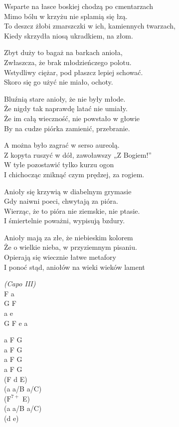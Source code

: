 \begin{text}
    \small{
    \hfill\break
Wsparte na łasce boskiej chodzą po cmentarzach\\
Mimo bólu w krzyżu nie splamią się łzą.\\
To deszcz żłobi zmarszczki w ich, kamiennych twarzach,\\
Kiedy skrzydła niosą ukradkiem, na złom.

Zbyt duży to bagaż na barkach anioła,\\
Zwłaszcza, że brak młodzieńczego polotu.\\
Wstydliwy ciężar, pod płaszcz lepiej schować.\\
Skoro się go użyć nie miało, ochoty.

Bluźnią stare anioły, że nie były młode.\\
Że nigdy tak naprawdę latać nie umiały.\\
Że im całą wieczność, nie powstało w głowie\\
By na cudze piórka zamienić, przebranie.

A można było zagrać w serso aureolą.\\
Z kopyta ruszyć w dół, zawoławszy „Z Bogiem!”\\
W tyle pozostawić tylko kurzu ogon\\
I chichocząc zniknąć czym prędzej, za rogiem.

Anioły się krzywią w diabelnym grymasie\\
Gdy naiwni poeci, chwytają za pióra.\\
Wierząc, że to pióra nie ziemskie, nie ptasie.\\
I śmiertelnie poważni, wypisują bzdury.

Anioły mają za złe, że niebieskim kolorem\\
Że o wielkie nieba, w przyziemnym pisaniu.\\
Opierają się wiecznie łatwe metafory\\
I ponoć stąd, aniołów na wieki wieków lament
    }
\end{text}
\begin{chord}
    \small{
    \textit{(Capo III)}\\
    F a\\
    G F\\
    a e\\
    G F e a

    a F G\\
    a F G\\
    a F G\\
    a F G\\
    (F d E)\\
    (a a/B a/C)\\
    ($\mathrm{F^{7+}}$ E)\\
    (a a/B a/C)\\
    (d e)
    }
\end{chord}

